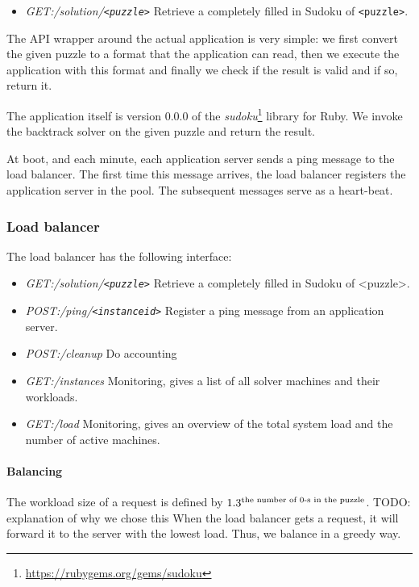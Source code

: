 		\begin{itemize}
			\item \emph{GET:/solution/\texttt{<puzzle>}} Retrieve a completely filled in Sudoku of \texttt{<puzzle>}.
		\end{itemize}

		The API wrapper around the actual application is very simple:
		we first convert the given puzzle to a format that the application can read, then we execute the application with this format and finally we check if the result is valid and if so, return it.

		The application itself is version 0.0.0 of the \textit{sudoku}\footnote{\url{https://rubygems.org/gems/sudoku}} library for Ruby.
		We invoke the backtrack solver on the given puzzle and return the result.
		
		At boot, and each minute, each application server sends a ping message to the load balancer.
		The first time this message arrives, the load balancer registers the application server in the pool.
		The subsequent messages serve as a heart-beat.
	\subsubsection{Load balancer}
		\label{sys:arch:load}

		The load balancer has the following interface:
		\begin{itemize}
			\item \emph{GET:/solution/\texttt{<puzzle>}} Retrieve a completely filled in Sudoku of <puzzle>.
			\item \emph{POST:/ping/\texttt{<instanceid>}} Register a ping message from an application server.
			\item \emph{POST:/cleanup} Do accounting
			\item \emph{GET:/instances} Monitoring, gives a list of all solver machines and their workloads.
			\item \emph{GET:/load} Monitoring, gives an overview of the total system load and the number of active machines.
		\end{itemize}
		
		\paragraph{Balancing}
			The workload size of a request is defined by $1.3^\textnormal{the number of 0-s in the puzzle}$.
			TODO: explanation of why we chose this
			When the load balancer gets a request, it will forward it to the server with the lowest load.
			Thus, we balance in a greedy way.
			
